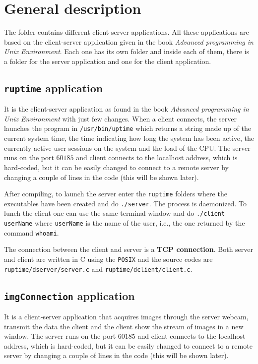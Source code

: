 \documentclass[12pt, letterpaper]{article}
\theoremstyle{definition}
\let\ti\textit
\let\tb\textbf
\begin{document}
\section{General description}
The folder contains different client-server applications. All these applications are based on the client-server application given in the book \ti{Advanced programming in Unix Environment}. Each one has its own folder and inside each of them, there is a folder for the server application and one for the client application.


\subsection{\lstinline+ruptime+ application}
It is the client-server application as found in the book \ti{Advanced programming in Unix Environment} with just few changes. When a client connects, the server launches the program in \lstinline+/usr/bin/uptime+ which returns a string made up of the current system time, the time indicating how long the system has been active, the currently active user sessions on the system and the load of the CPU. The server runs on the port $60185$ and client connects to the localhost address, which is hard-coded, but it can be easily changed to connect to a remote server by changing a couple of lines in the code (this will be shown later). 

After compiling, to launch the server enter the \lstinline+ruptime+ folders where the executables have been created and do \lstinline+./server+. The process is daemonized. To lunch the client one can use the same terminal window and do \lstinline+./client userName+ where \lstinline+userName+ is the name of the user, i.e., the one returned by the command \lstinline+whoami+.

The connection between the client and server is a \tb{TCP connection}. Both server and client are written in C using the \lstinline+POSIX+ and the source codes are \lstinline+ruptime/dserver/server.c+ and \lstinline+ruptime/dclient/client.c+.

\subsection{\lstinline+imgConnection+ application}
\label{imgConnection}
It is a client-server application that acquires images through the server webcam, transmit the data the client and the client show the stream of images in a new window. The server runs on the port $60185$ and client connects to the localhost address, which is hard-coded, but it can be easily changed to connect to a remote server by changing a couple of lines in the code (this will be shown later).
\end{document}

